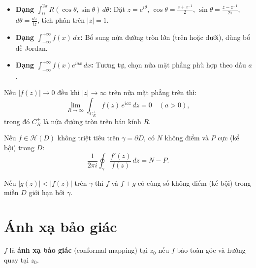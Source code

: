 \documentclass[12pt,a4paper]{article}
\begin{document}
\begin{phuongphap}[title={Ứng dụng tính tích phân thực}]
  \begin{itemize}
    \item \textbf{Dạng $\int_0^{2\pi} R(\cos\theta, \sin\theta)\,d\theta$:} Đặt $z = e^{i\theta}$, $\cos\theta = \frac{z + z^{-1}}{2}$, $\sin\theta = \frac{z - z^{-1}}{2i}$, $d\theta = \frac{dz}{iz}$, tích phân trên $|z| = 1$.
    \item \textbf{Dạng $\int_{-\infty}^{+\infty} f(x)\,dx$:} Bổ sung nửa đường tròn lớn (trên hoặc dưới), dùng bổ đề Jordan.
    \item \textbf{Dạng $\int_{-\infty}^{+\infty} f(x) e^{iax}\,dx$:} Tương tự, chọn nửa mặt phẳng phù hợp theo dấu $a$.
  \end{itemize}
\end{phuongphap}

\begin{dinhly}[title={Bổ đề Jordan}]
  Nếu $|f(z)| \to 0$ đều khi $|z| \to \infty$ trên nửa mặt phẳng trên thì:
  \[
    \lim_{R \to \infty} \int_{C_R^+} f(z)\,e^{iaz}\,dz = 0 \quad (a > 0),
  \]
  trong đó $C_R^+$ là nửa đường tròn trên bán kính $R$.
\end{dinhly}

\begin{dinhly}[title={Nguyên lý argument}]
  Nếu $f \in \mathcal{H}(D)$ không triệt tiêu trên $\gamma = \partial D$, có $N$ không điểm và $P$ cực (kể bội) trong $D$:
  \[
    \frac{1}{2\pi i}\oint_\gamma \frac{f'(z)}{f(z)}\,dz = N - P.
  \]
\end{dinhly}

\begin{dinhly}[title={Định lý Rouché}]
  Nếu $|g(z)| < |f(z)|$ trên $\gamma$ thì $f$ và $f + g$ có cùng số không điểm (kể bội) trong miền $D$ giới hạn bởi $\gamma$.
\end{dinhly}

\section{Ánh xạ bảo giác}

\begin{dinhnghia}
  $f$ là \textbf{ánh xạ bảo giác} (conformal mapping) tại $z_0$ nếu $f$ bảo toàn góc và hướng quay tại $z_0$.
\end{dinhnghia}
\end{document}
